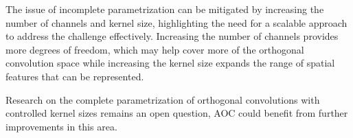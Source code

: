     The issue of incomplete parametrization can be mitigated by increasing the number of channels and kernel size, highlighting the need for a scalable approach to address the challenge effectively. Increasing the number of channels provides more degrees of freedom, which may help cover more of the orthogonal convolution space while increasing the kernel size expands the range of spatial features that can be represented.

    Research on the complete parametrization of orthogonal convolutions with controlled kernel sizes remains an open question, AOC could benefit from further improvements in this area.
    
    
    

